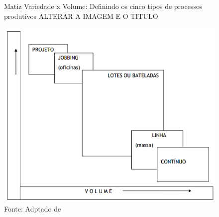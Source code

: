 \begin{figure}[H]
  \caption{Matiz Variedade x Volume: Definindo os cinco tipos de processos produtivos ALTERAR A IMAGEM E O TITULO}
  \includegraphics[scale=0.5]{images/tiposdeprocesso.png}
  \caption*{Fonte: Adptado de \cite{slack2009administracao}}
  \label{fig:tipos_de_processo_de_producao}
\end{figure}

